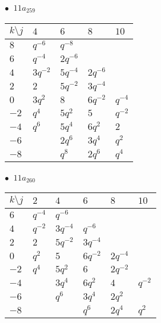 \begin{minipage}{\linewidth}
$\bullet\ $ $11a_{259}$ \vspace{0.5em} \\
\begin{tabular}{l|llll}
$k \setminus j$ & $4$ & $6$ & $8$ & $10$ \\
\hline
$8$ & $q^{-6}$ & $q^{-8}$ &  &  \\
$6$ & $q^{-4}$ & $2q^{-6}$ &  &  \\
$4$ & $3q^{-2}$ & $5q^{-4}$ & $2q^{-6}$ &  \\
$2$ & $2$ & $5q^{-2}$ & $3q^{-4}$ &  \\
$0$ & $3q^{2}$ & $8$ & $6q^{-2}$ & $q^{-4}$ \\
$-2$ & $q^{4}$ & $5q^{2}$ & $5$ & $q^{-2}$ \\
$-4$ & $q^{6}$ & $5q^{4}$ & $6q^{2}$ & $2$ \\
$-6$ &  & $2q^{6}$ & $3q^{4}$ & $q^{2}$ \\
$-8$ &  & $q^{8}$ & $2q^{6}$ & $q^{4}$ \\
\end{tabular}
\vspace{2em}
\end{minipage}
%
\begin{minipage}{\linewidth}
$\bullet\ $ $11a_{260}$ \vspace{0.5em} \\
\begin{tabular}{l|lllll}
$k \setminus j$ & $2$ & $4$ & $6$ & $8$ & $10$ \\
\hline
$6$ & $q^{-4}$ & $q^{-6}$ &  &  &  \\
$4$ & $q^{-2}$ & $3q^{-4}$ & $q^{-6}$ &  &  \\
$2$ & $2$ & $5q^{-2}$ & $3q^{-4}$ &  &  \\
$0$ & $q^{2}$ & $5$ & $6q^{-2}$ & $2q^{-4}$ &  \\
$-2$ & $q^{4}$ & $5q^{2}$ & $6$ & $2q^{-2}$ &  \\
$-4$ &  & $3q^{4}$ & $6q^{2}$ & $4$ & $q^{-2}$ \\
$-6$ &  & $q^{6}$ & $3q^{4}$ & $2q^{2}$ &  \\
$-8$ &  &  & $q^{6}$ & $2q^{4}$ & $q^{2}$ \\
\end{tabular}
\vspace{2em}
\end{minipage}
%
